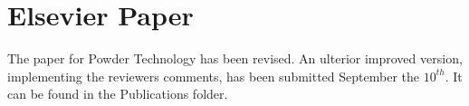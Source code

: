 
\section{Elsevier Paper}
\label{sec:elsevierpaper}

The paper for Powder Technology has been revised.
An ulterior improved version, implementing the reviewers comments, has been
submitted September the $10^{th}$.
It can be found in the Publications folder.\\
